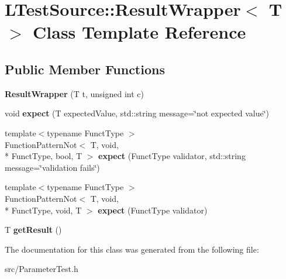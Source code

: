 \hypertarget{class_l_test_source_1_1_result_wrapper}{\section{L\-Test\-Source\-:\-:Result\-Wrapper$<$ T $>$ Class Template Reference}
\label{class_l_test_source_1_1_result_wrapper}
}
\subsection*{Public Member Functions}
\begin{DoxyCompactItemize}
\item 
\hypertarget{class_l_test_source_1_1_result_wrapper_a8748adf2614e47968fa82a6d6ce5cce9}{{\bfseries Result\-Wrapper} (T t, unsigned int c)}\label{class_l_test_source_1_1_result_wrapper_a8748adf2614e47968fa82a6d6ce5cce9}

\item 
\hypertarget{class_l_test_source_1_1_result_wrapper_aee8eafd9990aff1bc768b91a2f57e39b}{void {\bfseries expect} (T expected\-Value, std\-::string message=\char`\"{}not expected value\char`\"{})}\label{class_l_test_source_1_1_result_wrapper_aee8eafd9990aff1bc768b91a2f57e39b}

\item 
\hypertarget{class_l_test_source_1_1_result_wrapper_ab69fd23174e35891e7ad2215ec8417a5}{{\footnotesize template$<$typename Funct\-Type $>$ }\\Function\-Pattern\-Not$<$ T, void, \\*
Funct\-Type, bool, T $>$ {\bfseries expect} (Funct\-Type validator, std\-::string message=\char`\"{}validation fails\char`\"{})}\label{class_l_test_source_1_1_result_wrapper_ab69fd23174e35891e7ad2215ec8417a5}

\item 
\hypertarget{class_l_test_source_1_1_result_wrapper_a355ff3462b97f5781766927bd2314c47}{{\footnotesize template$<$typename Funct\-Type $>$ }\\Function\-Pattern\-Not$<$ T, void, \\*
Funct\-Type, void, T $>$ {\bfseries expect} (Funct\-Type validator)}\label{class_l_test_source_1_1_result_wrapper_a355ff3462b97f5781766927bd2314c47}

\item 
\hypertarget{class_l_test_source_1_1_result_wrapper_a00885385179c831e6bbe43cb4033c811}{T {\bfseries get\-Result} ()}\label{class_l_test_source_1_1_result_wrapper_a00885385179c831e6bbe43cb4033c811}

\end{DoxyCompactItemize}


The documentation for this class was generated from the following file\-:\begin{DoxyCompactItemize}
\item 
src/Parameter\-Test.\-h\end{DoxyCompactItemize}
